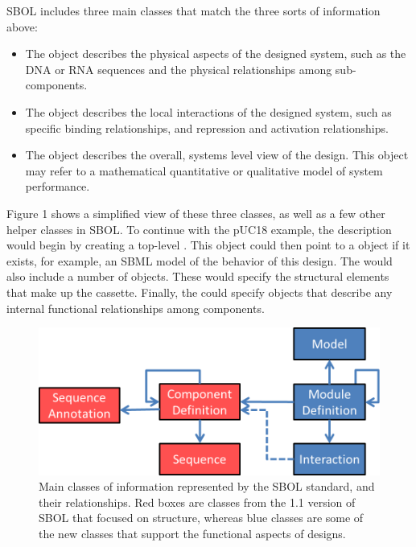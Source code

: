 SBOL includes three main classes that match the three sorts of information above:
\begin{itemize}
\item The  object describes the physical aspects of the designed system, such as the DNA or RNA sequences and the physical relationships among sub-components.
\item The  object describes the local interactions of the designed system, such as specific binding relationships, and repression and activation relationships. 
\item The  object describes the overall, systems level view of the design. This object may refer to a mathematical quantitative or qualitative model of system performance. 
\end{itemize}

Figure 1 shows a simplified view of these three classes, as well as a few other helper classes in SBOL. To continue with the pUC18 example, the description would begin by creating a top-level . This object could then point to a  object if it exists, for example, an SBML model of the behavior of this design. The  would also include a number of  objects. These would specify the structural elements that make up the cassette. Finally, the  could specify  objects that describe any internal functional relationships among components. 

\begin{figure}[ht]
\begin{center}
\includegraphics[scale=0.7]{images/OverviewFigforSpec-v3.png}
\caption{Main classes of information represented by the SBOL standard, and their relationships.  Red boxes are classes from the 1.1 version of SBOL that focused on structure, whereas blue classes are some of the new classes that support the functional aspects of designs.}
\label{images:overview1}
\end{center}
\end{figure}

